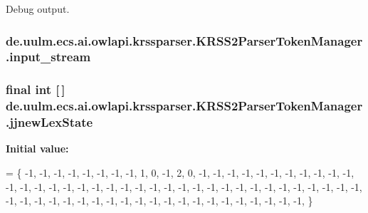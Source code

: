 Debug output. \hypertarget{classde_1_1uulm_1_1ecs_1_1ai_1_1owlapi_1_1krssparser_1_1_k_r_s_s2_parser_token_manager_ad7a0371ff58b583804b37bfa3ca79bb8}{
\subsubsection[{input\-\_\-stream}]{ de.\-uulm.\-ecs.\-ai.\-owlapi.\-krssparser.\-K\-R\-S\-S2\-Parser\-Token\-Manager.\-input\-\_\-stream\hspace{0.3cm}{\ttfamily [protected]}}}\label{classde_1_1uulm_1_1ecs_1_1ai_1_1owlapi_1_1krssparser_1_1_k_r_s_s2_parser_token_manager_ad7a0371ff58b583804b37bfa3ca79bb8}
\hypertarget{classde_1_1uulm_1_1ecs_1_1ai_1_1owlapi_1_1krssparser_1_1_k_r_s_s2_parser_token_manager_a0def0868039b62462745c9dacf9e75eb}{
\subsubsection[{jjnew\-Lex\-State}]{\setlength{\rightskip}{0pt plus 5cm}final int \mbox{[}$\,$\mbox{]} de.\-uulm.\-ecs.\-ai.\-owlapi.\-krssparser.\-K\-R\-S\-S2\-Parser\-Token\-Manager.\-jjnew\-Lex\-State\hspace{0.3cm}{\ttfamily [static]}}}\label{classde_1_1uulm_1_1ecs_1_1ai_1_1owlapi_1_1krssparser_1_1_k_r_s_s2_parser_token_manager_a0def0868039b62462745c9dacf9e75eb}
{\bfseries Initial value\-:}
\begin{DoxyCode}
= \{
        -1, -1, -1, -1, -1, -1, -1, -1, 1, 0, -1, 2, 0, -1, -1, -1, -1, -1, -1, -1, -1, -1, -1, -1, -1,
        -1, -1, -1, -1, -1, -1, -1, -1, -1, -1, -1, -1, -1, -1, -1, -1, -1, -1, -1, -1, -1, -1, -1, -1, -1,
        -1, -1, -1, -1, -1, -1, -1, -1, -1, -1, -1, -1, -1, -1, -1, -1, -1, -1, -1, -1,
    \}
\end{DoxyCode}
